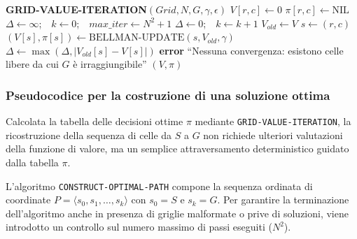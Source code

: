 \begin{algorithm}[H]
\caption{Calcolo del valore di una soluzione ottima}
\label{alg:gvi}
\begin{algorithmic}[1]
\Statex \textbf{GRID-VALUE-ITERATION}$(Grid, N, G, \gamma, \epsilon)$
 \label{gvi:init-start}
        \State \Do $V[r, c] \gets 0$
        \State $\pi[r, c] \gets \text{NIL}$
    \EndDoFor
\EndFor
\State $\Delta \gets \infty$;\ \ $k \gets 0$;\ \ $max\_iter \gets N^2 + 1$ \label{gvi:init-end}
 \label{gvi:while}
    \State \Do $\Delta \gets 0$;\ \ $k \gets k + 1$
    \State $V_{old} \gets V$ \label{gvi:copy}
     \label{gvi:scan}
         \label{gvi:scan-c}
            \State \Do $s \gets (r, c)$
                \State \Then $(V[s], \pi[s]) \gets \text{BELLMAN-UPDATE}(s, V_{old}, \gamma)$
                \State $\Delta \gets \max(\Delta, |V_{old}[s] - V[s]|)$ \label{gvi:while-end}
            \EndIf
        \EndDoFor
    \EndFor
\EndWhile
\If{$\Delta \ge \epsilon$}
    \State \Then \textbf{error} ``Nessuna convergenza: esistono celle libere da cui $G$ è irraggiungibile''
\EndIf
\State \Return $(V, \pi)$
\end{algorithmic}
\end{algorithm}

\clearpage
\subsubsection{Pseudocodice per la costruzione di una soluzione ottima}
Calcolata la tabella delle decisioni ottime $\pi$ mediante \texttt{GRID-VALUE-ITERATION}, la ricostruzione della sequenza di celle da $S$ a $G$ non richiede ulteriori valutazioni della funzione di valore, ma un semplice attraversamento deterministico guidato dalla tabella $\pi$.

\noindent
L'algoritmo \texttt{CONSTRUCT-OPTIMAL-PATH} compone la sequenza ordinata di coordinate $P = \langle s_0, s_1, \dots, s_k \rangle$ con $s_0 = S$ e $s_k = G$. Per garantire la terminazione dell'algoritmo anche in presenza di griglie malformate o prive di soluzioni, viene introdotto un controllo sul numero massimo di passi eseguiti ($N^2$).

